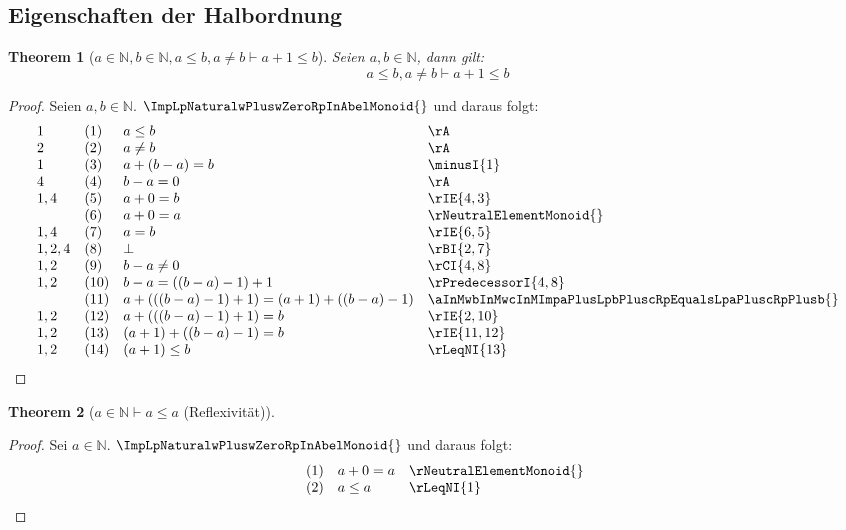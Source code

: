 \documentclass{book}
\theoremstyle{plain}
\newtheorem{theorem}{Theorem}
\theoremstyle{remark}
\theoremstyle{definition}
\begin{document}
\subsection{Eigenschaften der Halbordnung}

\label{aInNaturalwbInNaturalwaLeqbwaNotEqualsbImpaPlusOneLeqb}
\begin{theorem}[\(a\in\mathbb{N},b\in\mathbb{N}, a\leq b,a\neq b\vdash a+1\leq b\)]
Seien \(a,b\in\mathbb{N}\), dann gilt:
\[a\leq b,a\neq b\vdash a+1\leq b\]
\end{theorem}
\begin{proof}
    Seien \(a,b\in\mathbb{N}\). \(\ImpLpNaturalwPluswZeroRpInAbelMonoid{}\) und daraus folgt:
        \[
	\begin{array}{llll}
            1     &  (1) & a\leq b & \rA \\
            2     &  (2) & a\neq b & \rA \\
            1     &  (3) & a+(b-a)=b & \minusI{1} \\
            4     &  (4) & b-a=0 & \rA \\
            1,4   &  (5) & a+0=b & \rIE{4,3} \\
                  &  (6) & a+0=a & \rNeutralElementMonoid{} \\
            1,4   &  (7) & a=b & \rIE{6,5} \\
            1,2,4 &  (8) & \bot & \rBI{2,7} \\
            1,2   &  (9) & b-a\neq 0 & \rCI{4,8} \\
            1,2   &  (10) & b-a=((b-a)-1)+1 & \rPredecessorI{4,8} \\
                  &  (11) & a+(((b-a)-1)+1)=(a+1)+((b-a)-1) & \aInMwbInMwcInMImpaPlusLpbPluscRpEqualsLpaPluscRpPlusb{} \\
            1,2   &  (12) & a+(((b-a)-1)+1)=b & \rIE{2,10} \\
            1,2   &  (13) & (a+1)+((b-a)-1)=b & \rIE{11,12} \\
            1,2   &  (14) & (a+1)\leq b & \rLeqNI{13} \\
    \end{array}
	\]
\end{proof}

\label{aInNaturalImpaLeqa}
\begin{theorem}[\(a\in\mathbb{N}\vdash a\leq a\) (Reflexivität)]
\end{theorem}
\begin{proof}
        Sei \(a\in\mathbb{N}\). \(\ImpLpNaturalwPluswZeroRpInAbelMonoid{}\) und daraus folgt:
        \[
	\begin{array}{llll}
                &  (1) & a+0=a & \rNeutralElementMonoid{} \\
                &  (2) & a\leq a & \rLeqNI{1} \\
    \end{array}
	\]
\end{proof}
\end{document}

